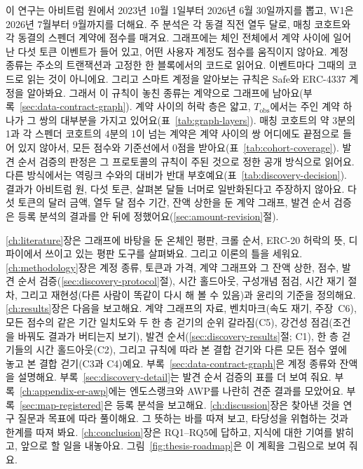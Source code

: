 이 연구는 아비트럼 원에서 2023년 10월 1일부터 2026년 6월 30일까지를 뽑고, W1은 2026년 7월부터 9월까지를 더해요. 주 분석은 각 동결 직전 열두 달로, 매칭 코호트와 각 동결의 스펜더 계약에 점수를 매겨요. 그래프에는 체인 전체에서 계약 사이에 일어난 다섯 토큰 이벤트가 들어 있고, 어떤 사용자 계정도 점수를 움직이지 않아요. 계정 종류는 주소의 트랜잭션과 고정한 한 블록에서의 코드로 읽어요. 이벤트마다 그때의 코드로 읽는 것이 아니에요. 그리고 스마트 계정을 알아보는 규칙은 Safe와 ERC-4337 계정을 알아봐요. 그래서 이 규칙이 놓친 종류는 계약으로 그래프에 남아요(부록~\ref{sec:data-contract-graph}). 계약 사이의 허락 층은 얇고, $T_{\mathrm{obs}}$에서는 주인 계약 하나가 그 쌍의 대부분을 가지고 있어요(표~\ref{tab:graph-layers}). 매칭 코호트의 약 3분의 1과 각 스펜더 코호트의 4분의 1이 넘는 계약은 계약 사이의 쌍 어디에도 끝점으로 들어 있지 않아서, 모든 점수와 기준선에서 0점을 받아요(표~\ref{tab:cohort-coverage}). 발견 순서 검증의 판정은 그 프로토콜의 규칙이 주된 것으로 정한 공개 방식으로 읽어요. 다른 방식에서는 역링크 수와의 대비가 반대 부호예요(표~\ref{tab:discovery-decision}). 결과가 아비트럼 원, 다섯 토큰, 살펴본 달들 너머로 일반화된다고 주장하지 않아요. 다섯 토큰의 달러 금액, 열두 달 점수 기간, 잔액 상한을 둔 계약 그래프, 발견 순서 검증은 등록 분석의 결과를 안 뒤에 정했어요(\ref{sec:amount-revision}절).


\ref{ch:literature}장은 그래프에 바탕을 둔 온체인 평판, 크롤 순서, ERC-20 허락의 뜻, 디파이에서 쓰이고 있는 평판 도구를 살펴봐요. 그리고 이론의 틀을 세워요. \ref{ch:methodology}장은 계정 종류, 토큰과 가격, 계약 그래프와 그 잔액 상한, 점수, 발견 순서 검증(\ref{sec:discovery-protocol}절), 시간 홀드아웃, 구성개념 점검, 시간 재기 절차, 그리고 재현성(다른 사람이 똑같이 다시 해 볼 수 있음)과 윤리의 기준을 정의해요. \ref{ch:results}장은 다음을 보고해요. 계약 그래프의 자료, 벤치마크(속도 재기, 주장~C6), 모든 점수의 같은 기간 일치도와 두 한 층 걷기의 순위 갈라짐(C5), 강건성 점검(조건을 바꿔도 결과가 버티는지 보기), 발견 순서(\ref{sec:discovery-results}절; C1), 한 층 걷기들의 시간 홀드아웃(C2), 그리고 규칙에 따라 본 결합 걷기와 다른 모든 점수 옆에 놓고 본 결합 걷기(C3과 C4)예요. 부록~\ref{sec:data-contract-graph}은 계정 종류와 잔액을 설명해요. 부록~\ref{sec:discovery-detail}는 발견 순서 검증의 표를 더 보여 줘요. 부록~\ref{ch:appendix-er-awp}에는 엔도스랭크와 AWP를 나란히 견준 결과를 모았어요. 부록~\ref{sec:map-registered}은 등록 분석을 보고해요. \ref{ch:discussion}장은 찾아낸 것을 연구 질문과 목표에 따라 풀이해요. 그 뜻하는 바를 따져 보고, 타당성을 위협하는 것과 한계를 따져 봐요. \ref{ch:conclusion}장은 RQ1--RQ5에 답하고, 지식에 대한 기여를 밝히고, 앞으로 할 일을 내놓아요. 그림~\ref{fig:thesis-roadmap}은 이 계획을 그림으로 보여 줘요.

